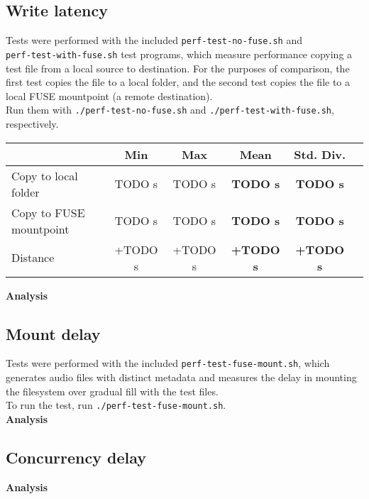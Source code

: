\documentclass{article}
\begin{document}
	\subsection{Write latency}
	Tests were performed with the included \texttt{perf-test-no-fuse.sh} and \\ \texttt{perf-test-with-fuse.sh} test programs, which measure performance copying a test file from a local source to destination. For the purposes of comparison, the first test copies the file to a local folder, and the second test copies the file to a local FUSE mountpoint (a remote destination). \\
	
	\noindent Run them with \texttt{./perf-test-no-fuse.sh} and \texttt{./perf-test-with-fuse.sh}, respectively.
	
	\vspace{0.25cm}
	\noindent  %
	
	\vspace{0.5cm}
	\noindent \begin{tabular}{l*{4}{c}r}
		& Min & Max & Mean & Std. Div. & \\
		\hline
		Copy to local folder & TODO s & TODO s & \textbf{TODO s} & \textbf{TODO s} &  \\
		Copy to FUSE mountpoint & TODO s & TODO s & \textbf{TODO s} & \textbf{TODO s} &  \\
		Distance           & +TODO s & +TODO s & \textbf{+TODO s} & \textbf{+TODO s} & \\
	\end{tabular}

	\vspace{0.5cm} 
	
	\noindent \textbf{Analysis}
	
	
	\subsection{Mount delay}
	Tests were performed with the included \texttt{perf-test-fuse-mount.sh}, which generates audio files with distinct metadata and measures the delay in mounting the filesystem over gradual fill with the test files. \\
	
	\noindent To run the test, run \texttt{./perf-test-fuse-mount.sh}. \\
	
	\noindent \textbf{Analysis}
	\subsection{Concurrency delay}
	
	\noindent \textbf{Analysis}
\end{document}
